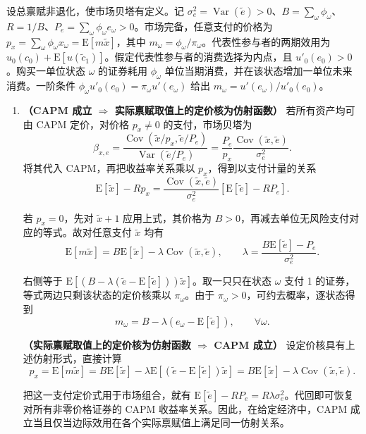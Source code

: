 \begin{solution}[label-content={证明},blank-type=manual,blank-vsep=9\baselineskip]
设总禀赋非退化，使市场贝塔有定义。记 $\sigma_e^2=\operatorname{Var}(\widetilde e)>0$、$B=\sum_\omega\phi_\omega$、$R=1/B$、$P_e=\sum_\omega\phi_\omega e_\omega>0$。市场完备，任意支付的价格为 $p_x=\sum_\omega\phi_\omega x_\omega=\mathrm E[m\widetilde x]$，其中 $m_\omega=\phi_\omega/\pi_\omega$。代表性参与者的两期效用为 $u_0(c_0)+\mathrm E[u(\widetilde c_1)]$。假定代表性参与者的消费选择为内点，且 $u'_0(e_0)>0$。购买一单位状态 $\omega$ 的证券耗用 $\phi_\omega$ 单位当期消费，并在该状态增加一单位未来消费。一阶条件 $\phi_\omega u'_0(e_0)=\pi_\omega u'(e_\omega)$ 给出 $m_\omega=u'(e_\omega)/u'_0(e_0)$。
\begin{enumerate}[label=(\alph*)]
\item \textbf{（CAPM 成立 $\Rightarrow$ 实际禀赋取值上的定价核为仿射函数）}
若所有资产均可由 CAPM 定价，对价格 $p_x\ne0$ 的支付，市场贝塔为
\[
 \beta_{x,e}=\frac{\operatorname{Cov}(\widetilde x/p_x,\widetilde e/P_e)}
 {\operatorname{Var}(\widetilde e/P_e)}
 =\frac{P_e}{p_x}\frac{\operatorname{Cov}(\widetilde x,\widetilde e)}{\sigma_e^2}.
\]
将其代入 CAPM，再把收益率关系乘以 $p_x$，得到以支付计量的关系
\[
 \mathrm E[\widetilde x]-Rp_x
 =\frac{\operatorname{Cov}(\widetilde x,\widetilde e)}{\sigma_e^2}
 [\mathrm E[\widetilde e]-RP_e].
\]

若 $p_x=0$，先对 $\widetilde x+1$ 应用上式，其价格为 $B>0$，再减去单位无风险支付对应的等式。故对任意支付 $\widetilde x$ 均有
\[
 \mathrm E[m\widetilde x]
 =B\mathrm E[\widetilde x]-\lambda\operatorname{Cov}(\widetilde x,\widetilde e),
 \qquad\lambda=\frac{B\mathrm E[\widetilde e]-P_e}{\sigma_e^2}.
\]

右侧等于 $\mathrm E[(B-\lambda(\widetilde e-\mathrm E[\widetilde e]))\widetilde x]$。取一只只在状态 $\omega$ 支付 1 的证券，等式两边只剩该状态的定价核乘以 $\pi_\omega$。由于 $\pi_\omega>0$，可约去概率，逐状态得到
\[
 \boxed{m_\omega=B-\lambda(e_\omega-\mathrm E[\widetilde e]),\qquad\forall\omega}.
\]

\textbf{（实际禀赋取值上的定价核为仿射函数 $\Rightarrow$ CAPM 成立）}
设定价核具有上述仿射形式，直接计算
\[
 p_x=\mathrm E[m\widetilde x]
 =B\mathrm E[\widetilde x]-\lambda\mathrm E[(\widetilde e-\mathrm E[\widetilde e])\widetilde x]
 =B\mathrm E[\widetilde x]-\lambda\operatorname{Cov}(\widetilde x,\widetilde e).
\]

把这一支付定价式用于市场组合，就有 $\mathrm E[\widetilde e]-RP_e=R\lambda\sigma_e^2$。代回即可恢复对所有非零价格证券的 CAPM 收益率关系。因此，在给定经济中，CAPM 成立当且仅当边际效用在各个实际禀赋值上满足同一仿射关系。


\end{enumerate}
\end{solution}

